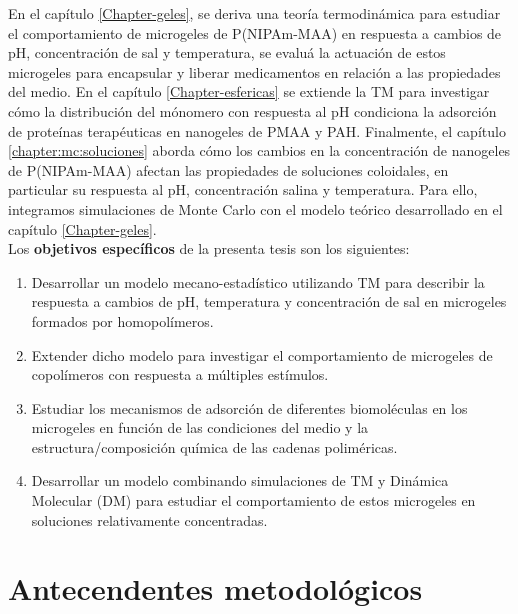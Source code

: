 En el cap\'itulo \ref{Chapter-geles}, se deriva una teor\'ia termodin\'amica para estudiar el comportamiento de microgeles de P(NIPAm-MAA) en respuesta a cambios de pH, concentraci\'on de sal y temperatura, se evalu\'a la actuaci\'on de estos microgeles para encapsular y liberar medicamentos en relaci\'on a las propiedades del medio. En el cap\'itulo \ref{Chapter-esfericas} se extiende la TM para investigar c\'omo la distribuci\'on del m\'onomero con respuesta al pH condiciona la adsorci\'on de prote\'inas terap\'euticas en nanogeles de PMAA y PAH.
Finalmente, el cap\'itulo \ref{chapter:mc:soluciones} aborda c\'omo los cambios en la concentraci\'on de nanogeles de P(NIPAm-MAA) afectan las propiedades de soluciones coloidales, en particular su respuesta al pH, concentraci\'on salina y temperatura. Para ello, integramos simulaciones de Monte Carlo con el modelo te\'orico desarrollado en el  cap\'itulo \ref{Chapter-geles}.\\

Los {\bf objetivos espec\'ificos} de la presenta tesis son los siguientes:
%
\begin{enumerate}
	\item Desarrollar un modelo mecano-estad\'istico utilizando TM para describir la respuesta a cambios de pH, temperatura y concentraci\'on de sal en microgeles formados por homopol\'imeros.\label{objetivo_1}
	\item Extender dicho modelo para investigar el comportamiento de microgeles de copol\'imeros con respuesta a m\'ultiples est\'imulos.\label{objetivo_2}
	\item Estudiar los mecanismos de adsorci\'on de diferentes biomol\'eculas en los microgeles en funci\'on de las condiciones del medio y la estructura/composici\'on qu\'imica de las cadenas polim\'ericas.\label{objetivo_3}
	\item Desarrollar un modelo combinando simulaciones de TM y Din\'amica Molecular (DM) para estudiar el comportamiento de estos microgeles en soluciones relativamente concentradas.\label{objetivo_4}
\end{enumerate}

\section{Antecendentes metodol\'ogicos}\label{sec:intro:metodologicos}

